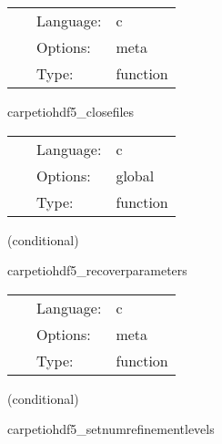 \documentclass{article}
\begin{document}
\hspace{5mm}{\it termination checkpoint routine } 


\hspace{5mm}

 \begin{tabular*}{160mm}{cll} 
~ & Language:  & c \\ 
~ & Options:  & meta \\ 
~ & Type:  & function \\ 
\end{tabular*} 


\vspace{5mm}


\hspace{5mm} carpetiohdf5\_closefiles 

\hspace{5mm}{\it close all filereader input files } 


\hspace{5mm}

 \begin{tabular*}{160mm}{cll} 
~ & Language:  & c \\ 
~ & Options:  & global \\ 
~ & Type:  & function \\ 
\end{tabular*} 


\vspace{5mm}

   (conditional) 

\hspace{5mm} carpetiohdf5\_recoverparameters 

\hspace{5mm}{\it parameter recovery routine } 


\hspace{5mm}

 \begin{tabular*}{160mm}{cll} 
~ & Language:  & c \\ 
~ & Options:  & meta \\ 
~ & Type:  & function \\ 
\end{tabular*} 


\vspace{5mm}

   (conditional) 

\hspace{5mm} carpetiohdf5\_setnumrefinementlevels 
\end{document}
